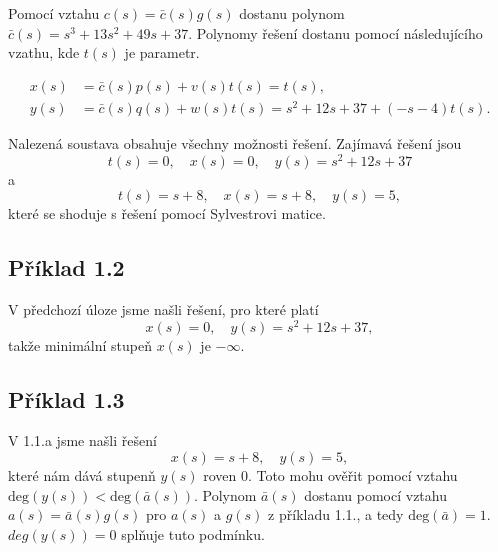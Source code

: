 \documentclass[12pt]{article}
\begin{document}
Pomocí vztahu $c(s) = \bar{c}(s)g(s)$ dostanu polynom $\bar{c}(s)=s^3 + 13s^2 + 49s + 37$.
Polynomy řešení dostanu pomocí následujícího vzathu, kde $t(s)$ je parametr.

\begin{equation}
  \begin{aligned}
    x(s) &= \bar{c}(s)p(s) + v(s)t(s) = t(s), \\
    y(s) &= \bar{c}(s)q(s) + w(s)t(s) = s^2 + 12s + 37 + (-s - 4)t(s).
  \end{aligned}
\end{equation}

Nalezená soustava obsahuje všechny možnosti řešení. Zajímavá řešení jsou
\begin{equation}
  t(s) = 0, \quad x(s) = 0, \quad y(s) = s^2 + 12s + 37
\end{equation}
a
\begin{equation}
  t(s) = s + 8, \quad x(s) = s + 8, \quad y(s) = 5,
\end{equation}
které se shoduje s řešení pomocí Sylvestrovi matice.

\subsection{Příklad 1.2}
V předchozí úloze jsme našli řešení, pro které platí 
\begin{equation}
  x(s) = 0, \quad y(s) = s^2 + 12s + 37,
\end{equation}
takže minimální stupeň $x(s)$ je $-\infty$.

\subsection{Příklad 1.3}
V 1.1.a jsme našli řešení
\begin{equation}
  x(s) = s + 8, \quad y(s) = 5,
\end{equation}
které nám dává stupenň $y(s)$ roven 0. Toto mohu ověřit pomocí vztahu
$\text{deg}(y(s)) < \text{deg}(\bar{a}(s))$.  Polynom $\bar{a}(s)$ dostanu
pomocí vztahu $a(s) = \bar{a}(s)g(s)$ pro $a(s)$ a $g(s)$ z příkladu 1.1., a
tedy $\text{deg}(\bar{a})=1$. $deg(y(s)) = 0$ splňuje tuto podmínku.
\end{document}
